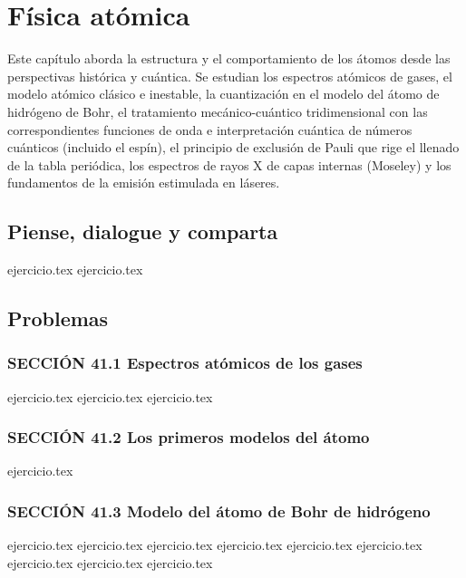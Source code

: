 \chapter{Física atómica}
\label{cap:fisica_atomica}

Este capítulo aborda la estructura y el comportamiento de los átomos desde las perspectivas histórica y cuántica. Se estudian los espectros atómicos de gases, el modelo atómico clásico e inestable, la cuantización en el modelo del átomo de hidrógeno de Bohr, el tratamiento mecánico-cuántico tridimensional con las correspondientes funciones de onda e interpretación cuántica de números cuánticos (incluido el espín), el principio de exclusión de Pauli que rige el llenado de la tabla periódica, los espectros de rayos X de capas internas (Moseley) y los fundamentos de la emisión estimulada en láseres.

\section*{Piense, dialogue y comparta}
\begin{enumerate}
    {ejercicio.tex}
    {ejercicio.tex}
\end{enumerate}

\section*{Problemas}

\subsection*{SECCIÓN 41.1 Espectros atómicos de los gases}
\begin{enumerate}
    {ejercicio.tex}
    {ejercicio.tex}
    {ejercicio.tex}
\end{enumerate}

\subsection*{SECCIÓN 41.2 Los primeros modelos del átomo}
\begin{enumerate}
    \setcounter{enumi}{3}
    {ejercicio.tex}
\end{enumerate}

\subsection*{SECCIÓN 41.3 Modelo del átomo de Bohr de hidrógeno}
\begin{enumerate}
    \setcounter{enumi}{4}
    {ejercicio.tex}
    {ejercicio.tex}
    {ejercicio.tex}
    {ejercicio.tex}
    {ejercicio.tex}
    {ejercicio.tex}
    {ejercicio.tex}
    {ejercicio.tex}
    {ejercicio.tex}
\end{enumerate}

